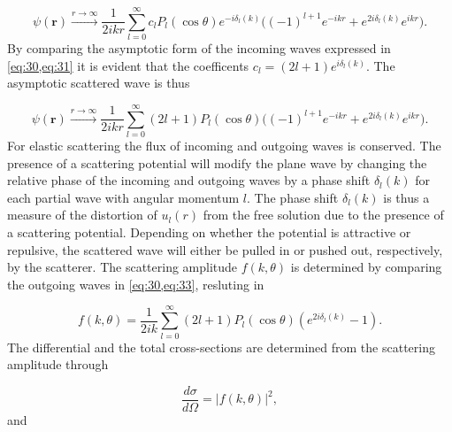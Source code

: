 \documentclass{article}
\providecommand{\abs}[1]{\lvert#1\rvert} \providecommand{\norm}[1]{\lVert#1\rVert}
\numberwithin{equation}{section}
\begin{document}
\begin{equation}\label{eq:31}
\psi(\mathbf{r}) \xrightarrow{r \to \infty} \frac{1}{2ikr} \sum_{l=0}^{\infty} c_l P_l(\cos\theta) e^{-i\delta_l(k)} \big((-1)^{l+1}e^{-ikr} + e^{2i\delta_l(k)}e^{ikr}\big).
\end{equation} 
By comparing the asymptotic form of the incoming waves expressed in \cref{eq:30,eq:31} it is evident that the coefficents $c_l = (2l+1)e^{i\delta_l(k)}$. The asymptotic scattered wave is thus

\begin{equation}\label{eq:33}
\psi(\mathbf{r}) \xrightarrow{r \to \infty} \frac{1}{2ikr} \sum_{l=0}^{\infty} (2l+1) P_l(\cos\theta)\big((-1)^{l+1}e^{-ikr} + e^{2i\delta_l(k)}e^{ikr}\big).
\end{equation}
For elastic scattering the flux of incoming and outgoing waves is conserved. The presence of a scattering potential will modify the plane wave by changing the relative phase of the incoming and outgoing waves by a phase shift $\delta_l(k)$ for each partial wave with angular momentum $l$. The phase shift $\delta_l(k)$ is thus a measure of the distortion of $u_l(r)$ from the free solution due to the presence of a scattering potential. Depending on whether the potential is attractive or repulsive, the scattered wave will either be pulled in or pushed out, respectively, by the scatterer. The scattering amplitude $f(k,\theta)$ is determined by comparing the outgoing waves in \cref{eq:30,eq:33}, resluting in

\begin{equation}
f(k,\theta) = \frac{1}{2ik}\sum_{l=0}^{\infty} (2l+1)P_l(\cos\theta)(e^{2i\delta_l(k)} - 1).
\end{equation}
The differential and the total cross-sections are determined from the scattering amplitude through 

\begin{equation}
\frac{d\sigma}{d\Omega}=\abs{f(k,\theta)}^2,
\end{equation}
and
\end{document}
